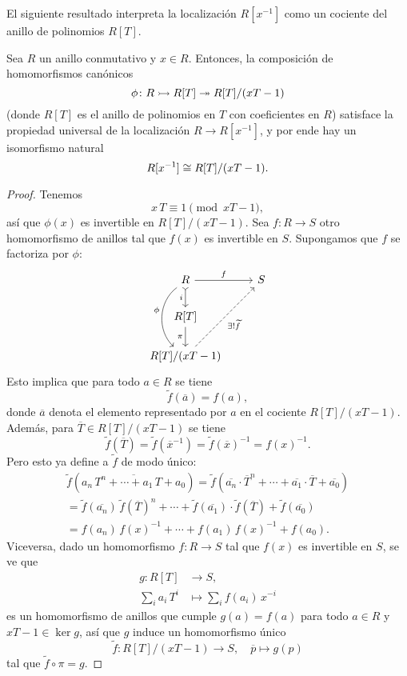 El siguiente resultado interpreta la localización $R [x^{-1}]$ como un cociente
del anillo de polinomios $R [T]$.

\begin{proposicion}
  Sea $R$ un anillo conmutativo y $x \in R$. Entonces, la composición de
  homomorfismos canónicos
  $$\phi\colon R \rightarrowtail R [T] \twoheadrightarrow R [T] / (xT - 1)$$
  (donde $R [T]$ es el anillo de polinomios en $T$ con coeficientes en $R$)
  satisface la propiedad universal de la localización $R \to R [x^{-1}]$, y por
  ende hay un isomorfismo natural
  $$R [x^{-1}] \cong R [T] / (xT - 1).$$

  \begin{proof}
    Tenemos
    $$x\,T \equiv 1 \pmod{xT - 1},$$
    así que $\phi (x)$ es invertible en $R [T] / (xT - 1)$.
    Sea $f\colon R \to S$ otro homomorfismo de anillos tal que $f (x)$
    es invertible en $S$. Supongamos que $f$ se factoriza por $\phi$:
    \[ \begin{tikzcd}
        R\ar{r}{f}\ar[>->]{d}[swap]{i}\ar[bend right=50]{dd}[swap]{\phi} & S \\
        R [T] \ar{d}[swap]{\pi} \\
        R [T] / (xT - 1)\ar[dashed]{uur}[swap]{\exists ! \widetilde{f}}
      \end{tikzcd} \]
    Esto implica que para todo $a\in R$ se tiene
    $$\widetilde{f} (\overline{a}) = f (a),$$
    donde $\overline{a}$ denota el elemento representado por $a$ en el cociente
    $R [T]/(xT - 1)$. Además, para $\overline{T} \in R [T]/(xT - 1)$ se tiene
    \[ \widetilde{f} (\overline{T}) =
       \widetilde{f} (\overline{x}^{-1}) =
       \widetilde{f} (\overline{x})^{-1} = f (x)^{-1}. \]
    Pero esto ya define a $\widetilde{f}$ de modo único:
    \begin{multline*}
      \widetilde{f} (\overline{a_n\,T^n + \cdots + a_1\,T + a_0}) =
      \widetilde{f} (\overline{a_n}\cdot\overline{T}^n + \cdots + \overline{a_1}\cdot\overline{T} + \overline{a_0}) \\
      = \widetilde{f} (\overline{a_n})\,\widetilde{f} (\overline{T})^n + \cdots + \widetilde{f} (\overline{a_1})\cdot \widetilde{f} (\overline{T}) + \widetilde{f} (\overline{a_0}) \\
      = f (a_n)\,f (x)^{-1} + \cdots + f (a_1)\,f(x)^{-1} + f (a_0).
    \end{multline*}
    Viceversa, dado un homomorfismo $f\colon R\to S$ tal que $f (x)$ es
    invertible en $S$, se ve que
    \begin{align*}
      g\colon R [T] & \to S,\\
      \sum_i a_i\,T^i & \mapsto \sum_i f (a_i)\,x^{-i}
    \end{align*}
    es un homomorfismo de anillos que cumple $g (a) = f (a)$ para todo $a\in R$
    y $xT - 1 \in \ker g$, así que $g$ induce un homomorfismo único
    $$\widetilde{f}\colon R [T]/(xT - 1) \to S, \quad \overline{p} \mapsto g (p)$$
    tal que $\widetilde{f}\circ \pi = g$.


\end{proof}
\end{proposicion}
